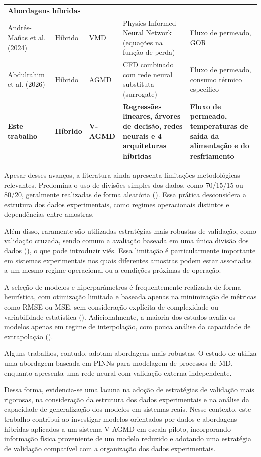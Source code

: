 \begin{longtable}{p{3.2cm} p{1.8cm} p{1.8cm} p{3.8cm} p{3.8cm}}
\multicolumn{5}{l}{\textbf{Abordagens híbridas}} \\
Andrés-Mañas et al. (2024) & Híbrido & VMD & Physics-Informed Neural Network (equações na função de perda) & Fluxo de permeado, GOR \\
Abdulrahim et al. (2026) & Híbrido & AGMD & CFD combinado com rede neural substituta (surrogate) & Fluxo de permeado, consumo térmico específico \\
\midrule
\textbf{Este trabalho} & \textbf{Híbrido} & \textbf{V-AGMD} & \textbf{Regressões lineares, árvores de decisão, redes neurais e 4 arquiteturas híbridas} & \textbf{Fluxo de permeado, temperaturas de saída da alimentação e do resfriamento} \\
\end{longtable}

Apesar desses avanços, a literatura ainda apresenta limitações metodológicas relevantes. Predomina o uso de divisões simples dos dados, como 70/15/15 ou 80/20, geralmente realizadas de forma aleatória (\cite{ANN_VMD_Fouling, ReviewAI_MD}). Essa prática desconsidera a estrutura dos dados experimentais, como regimes operacionais distintos e dependências entre amostras.

Além disso, raramente são utilizadas estratégias mais robustas de validação, como validação cruzada, sendo comum a avaliação baseada em uma única divisão dos dados (\cite{ANN_VMD_Fouling}), o que pode introduzir viés. Essa limitação é particularmente importante em sistemas experimentais nos quais diferentes amostras podem estar associadas a um mesmo regime operacional ou a condições próximas de operação.

A seleção de modelos e hiperparâmetros é frequentemente realizada de forma heurística, com otimização limitada e baseada apenas na minimização de métricas como RMSE ou MSE, sem consideração explícita de complexidade ou variabilidade estatística (\cite{ANN_VMD_Fouling}). Adicionalmente, a maioria dos estudos avalia os modelos apenas em regime de interpolação, com pouca análise da capacidade de extrapolação (\cite{ANN_VMD_Fouling, ReviewAI_MD}).

Alguns trabalhos, contudo, adotam abordagens mais robustas. O estudo de \cite{PINN_MD} utiliza uma abordagem baseada em PINNs para modelagem de processos de MD, enquanto \cite{ReviewAI_MD} apresenta uma rede neural com validação externa independente.

Dessa forma, evidencia-se uma lacuna na adoção de estratégias de validação mais rigorosas, na consideração da estrutura dos dados experimentais e na análise da capacidade de generalização dos modelos em sistemas reais. Nesse contexto, este trabalho contribui ao investigar modelos orientados por dados e abordagens híbridas aplicados a um sistema V-AGMD em escala piloto, incorporando informação física proveniente de um modelo reduzido e adotando uma estratégia de validação compatível com a organização dos dados experimentais.